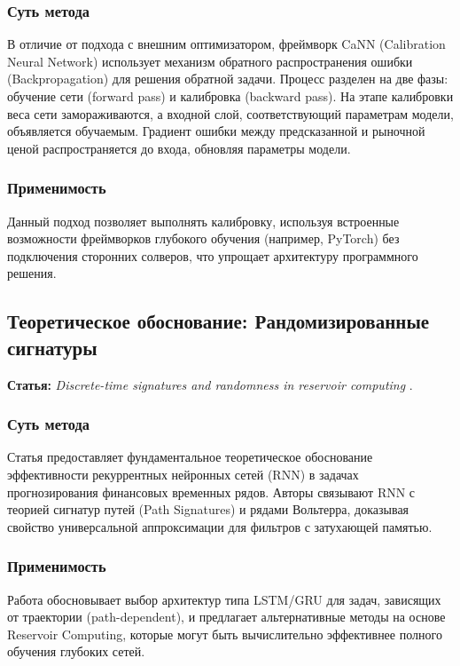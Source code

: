 \subsubsection{Суть метода}
В отличие от подхода с внешним оптимизатором, фреймворк CaNN (Calibration Neural Network) использует механизм обратного распространения ошибки (Backpropagation) для решения обратной задачи.
Процесс разделен на две фазы: обучение сети (forward pass) и калибровка (backward pass). На этапе калибровки веса сети замораживаются, а входной слой, соответствующий параметрам модели, объявляется обучаемым. Градиент ошибки между предсказанной и рыночной ценой распространяется до входа, обновляя параметры модели.

\subsubsection{Применимость}
Данный подход позволяет выполнять калибровку, используя встроенные возможности фреймворков глубокого обучения (например, PyTorch) без подключения сторонних солверов, что упрощает архитектуру программного решения.

\subsection{Теоретическое обоснование: Рандомизированные сигнатуры}
\textbf{Статья:} \textit{Discrete-time signatures and randomness in reservoir computing} \cite{Cuchiero2021}.

\subsubsection{Суть метода}
Статья предоставляет фундаментальное теоретическое обоснование эффективности рекуррентных нейронных сетей (RNN) в задачах прогнозирования финансовых временных рядов. Авторы связывают RNN с теорией сигнатур путей (Path Signatures) и рядами Вольтерра, доказывая свойство универсальной аппроксимации для фильтров с затухающей памятью.

\subsubsection{Применимость}
Работа обосновывает выбор архитектур типа LSTM/GRU для задач, зависящих от траектории (path-dependent), и предлагает альтернативные методы на основе Reservoir Computing, которые могут быть вычислительно эффективнее полного обучения глубоких сетей.

